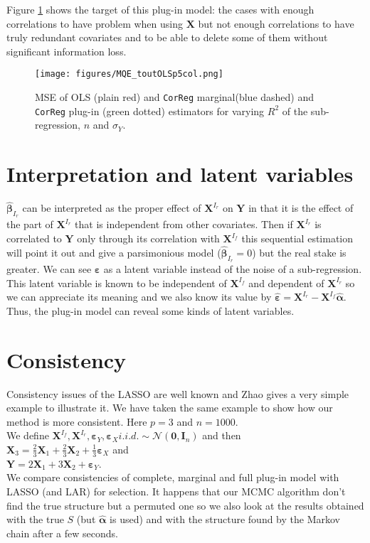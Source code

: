 \documentclass[12pt,a4paper]{report}
\begin{document}
	Figure \ref{MQE2} shows the target of this plug-in model: the cases with enough correlations to have problem when using $\boldsymbol{X}$	but not enough correlations to have truly redundant covariates and to be able to delete some of them without significant information loss.
\begin{figure}[h!]
	\texttt{[image: figures/MQE\_toutOLSp5col.png]}
	\caption{MSE of OLS (plain red) and {\tt CorReg} marginal(blue dashed) and {\tt CorReg} plug-in (green dotted) estimators for varying $R^2$ of the sub-regression, $n$ and $\sigma_Y$.}\label{MQE2}
\end{figure}	
			
		
	\section{Interpretation and latent variables}
			$\hat{\boldsymbol{\beta}}_{I_r}$ can be interpreted as the proper effect of $\boldsymbol{X}^{I_r}$ on $\boldsymbol{Y}$ in that it is the effect of the part of $\boldsymbol{X}^{I_r}$ that is independent from other covariates. Then if $\boldsymbol{X}^{I_r}$ is correlated to $\boldsymbol{Y}$ only through its correlation with $\boldsymbol{X}^{I_f}$ this sequential estimation will point it out and give a parsimonious model ($\hat{\boldsymbol{\beta}}_{I_r}=0$) but the real stake is greater. We can see $\boldsymbol{\varepsilon}$ as a latent variable instead of the noise of a sub-regression. This latent variable is known to be independent of $\boldsymbol{X}^{I_f}$ and dependent of $\boldsymbol{X}^{I_r}$ so we can appreciate its meaning and we also know its value by $\hat{\boldsymbol{\varepsilon}}=\boldsymbol{X}^{I_r}-\boldsymbol{X}^{I_f}\hat{\boldsymbol{\alpha}}$. Thus, the plug-in model can reveal some kinds of latent variables.
			
	

	\section{Consistency}\label{consistency}
		Consistency issues of the LASSO are well known and Zhao \cite{Zhao2006MSC} gives a very simple example to illustrate it.
		We have taken the same example to show how our method is more consistent.
		Here $p=3$ and $n=1000$.\\
		We define $\boldsymbol{X}^{I_f}, \boldsymbol{X}^{I_r}, \boldsymbol{\varepsilon}_Y, \boldsymbol{\varepsilon}_{X} i.i.d. \sim \mathcal{N}(\boldsymbol{0},\boldsymbol{I}_n)$ and then \\
		$\boldsymbol{X}_3=\frac{2}{3}\boldsymbol{X}_1+\frac{2}{3}\boldsymbol{X}_2+\frac{1}{3}\boldsymbol{\varepsilon}_X$ and \\
		$\boldsymbol{Y}=2\boldsymbol{X}_1+3\boldsymbol{X}_2+\boldsymbol{\varepsilon}_Y$.\\
		We compare consistencies of complete, marginal and full plug-in model with LASSO (and LAR) for selection.
		It happens that our MCMC algorithm don't find the true structure but a permuted one so we also look at the results obtained with the true $S$ (but $\hat{\boldsymbol{\alpha}}$ is used) and with the structure found by the Markov chain after a few seconds.
		
\end{document}
